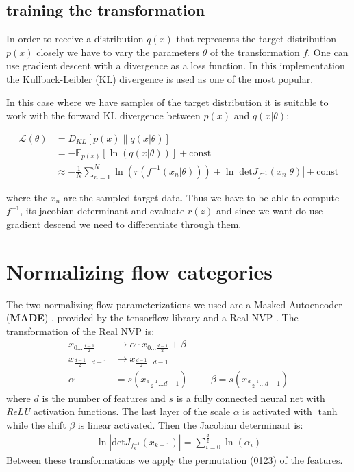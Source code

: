 \documentclass[%
 reprint,
 amsmath,amssymb,
 aps,
]{revtex4-2}
\begin{document}
\subsection{training the transformation}
In order to receive a distribution $q(x)$ that represents the target distribution $p(x)$ closely we have to vary the parameters $\theta$ of the transformation $f$. One can use gradient descent with a divergence as a loss function. In this implementation the Kullback-Leibler (KL) divergence is used as one of the most popular.

In this case where we have samples of the target distribution it is suitable to work with the forward KL divergence between $p(x)$ and $q(x|\theta)$:

\begin{align*}
	\mathcal{L}(\theta) &= D_{KL}\left[p(x)\middle\|q(x|\theta)\right]\\
	&=-\mathbb{E}_{p(x)}\left[\ln(q(x|\theta))\right] + \text{const} \\
	&\approx -\frac{1}{N}\sum_{n=1}^{N}\ln(r(f^{-1}(x_n|\theta))) + \ln\left|\text{det}J_{f^{-1}}(x_n|\theta)\right| + \text{const}
\end{align*} 

where the $x_n$ are the sampled target data. Thus we have to be able to compute $f^{-1}$, its jacobian determinant and evaluate $r(z)$ and since we want do use gradient descend we need to differentiate through them. \cite{LuRi}

\section{Normalizing flow categories}
The two normalizing flow parameterizations we used are a Masked Autoencoder (\textbf{MADE}) \cite{pmlr-v37-germain15}, provided by the tensorflow library and a Real NVP \cite{JMLR:v22:19-1028}. 
The transformation of the Real NVP is:
\begin{align*}
	x_{0...\frac{d-1}{2}} &\rightarrow \alpha \cdot x_{0...\frac{d-1}{2}} + \beta\\
	x_{\frac{d-1}{2}...d-1} &\rightarrow x_{\frac{d-1}{2}...d-1} \\
	\alpha &= s(x_{\frac{d-1}{2}...d-1}) \hspace{1cm} \beta = s(x_{\frac{d-1}{2}...d-1})
\end{align*}
where $d$ is the number of features and $s$ is a fully connected neural net with \textit{ReLU} activation functions. The last layer of the scale $\alpha$ is activated with $\tanh$ while the shift $\beta$ is linear activated.
Then the Jacobian determinant is:
\begin{align*}
	\ln\left|\text{det}J_{f_{k}^{-1}}(x_{k-1})\right| = \sum_{i=0}^{\frac{d}{2}} \ln(\alpha_i)
\end{align*}
Between these transformations we apply the permutation (0123) of the features.
\end{document}

